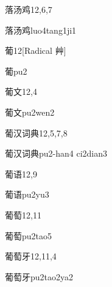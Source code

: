 \begin{entry}{落汤鸡}{12,6,7}
  \begin{phonetics}{落汤鸡}{luo4tang1ji1}
  \end{phonetics}
\end{entry}

\begin{entry}{葡}{12}[Radical 艸]
  \begin{phonetics}{葡}{pu2}
  \end{phonetics}
\end{entry}

\begin{entry}{葡文}{12,4}
  \begin{phonetics}{葡文}{pu2wen2}
  \end{phonetics}
\end{entry}

\begin{entry}{葡汉词典}{12,5,7,8}
  \begin{phonetics}{葡汉词典}{pu2-han4 ci2dian3}
  \end{phonetics}
\end{entry}

\begin{entry}{葡语}{12,9}
  \begin{phonetics}{葡语}{pu2yu3}
  \end{phonetics}
\end{entry}

\begin{entry}{葡萄}{12,11}
  \begin{phonetics}{葡萄}{pu2tao5}
  \end{phonetics}
\end{entry}

\begin{entry}{葡萄牙}{12,11,4}
  \begin{phonetics}{葡萄牙}{pu2tao2ya2}
  \end{phonetics}
\end{entry}

